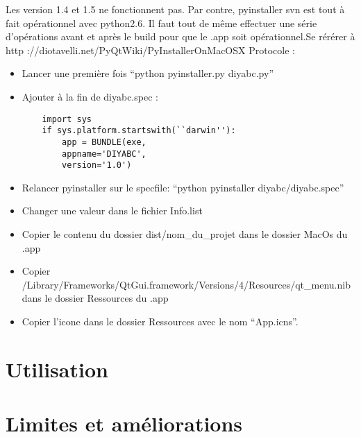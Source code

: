 \documentclass[12pt,a4paper]{article}
\begin{document}
        Les version 1.4 et 1.5 ne fonctionnent pas. Par contre,
        pyinstaller svn est tout à fait op\'erationnel avec python2.6. Il faut tout de même effectuer une s\'erie d'op\'erations avant et après
        le build pour que le .app soit op\'erationnel.Se r\'er\'erer à \newline
        http ://diotavelli.net/PyQtWiki/PyInstallerOnMacOSX \newline
        Protocole : 
        \begin{itemize}
            \item Lancer une première fois ``python pyinstaller.py diyabc.py''
            \item Ajouter à la fin de diyabc.spec :
        \begin{verbatim}
    import sys 
    if sys.platform.startswith(``darwin''): 
        app = BUNDLE(exe, 
        appname='DIYABC', 
        version='1.0')
        \end{verbatim}
            \item Relancer pyinstaller sur le specfile: ``python pyinstaller diyabc/diyabc.spec''
            \item Changer une valeur dans le fichier Info.list
            \item Copier le contenu du dossier dist/nom\_du\_projet dans le dossier MacOs du .app
            \item Copier /Library/Frameworks/QtGui.framework/Versions/4/Resources/qt\_menu.nib dans le dossier Ressources du .app
            \item Copier l'icone dans le dossier Ressources avec le nom ``App.icns''.
        \end{itemize}

\section{Utilisation}

\section{Limites et améliorations}
\end{document}
